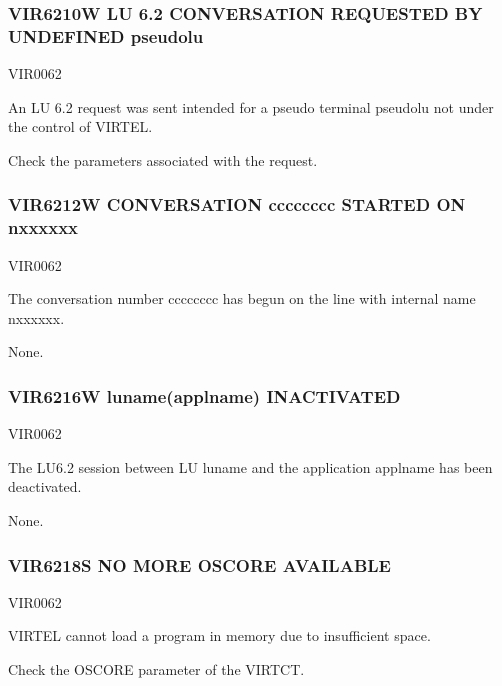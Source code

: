 \documentclass[letterpaper,10pt,english]{sphinxmanual}
\begin{document}
\subsubsection{VIR6210W LU 6.2 CONVERSATION REQUESTED BY UNDEFINED pseudolu}
\label{\detokenize{messages:vir6210w-lu-6-2-conversation-requested-by-undefined-pseudolu}}\begin{description}
\sphinxAtStartPar
VIR0062

\sphinxAtStartPar
An LU 6.2 request was sent intended for a pseudo terminal pseudolu not under the control of VIRTEL.

\sphinxAtStartPar
Check the parameters associated with the request.

\end{description}


\subsubsection{VIR6212W CONVERSATION cccccccc STARTED  ON n\sphinxhyphen{}xxxxxx}
\label{\detokenize{messages:vir6212w-conversation-cccccccc-started-on-n-xxxxxx}}\begin{description}
\sphinxAtStartPar
VIR0062

\sphinxAtStartPar
The conversation number cccccccc has begun on the line with internal name n\sphinxhyphen{}xxxxxx.

\sphinxAtStartPar
None.

\end{description}


\subsubsection{VIR6216W luname(applname) INACTIVATED}
\label{\detokenize{messages:vir6216w-luname-applname-inactivated}}\begin{description}
\sphinxAtStartPar
VIR0062

\sphinxAtStartPar
The LU6.2 session between LU luname and the application applname has been deactivated.

\sphinxAtStartPar
None.

\end{description}


\subsubsection{VIR6218S NO MORE OSCORE AVAILABLE}
\label{\detokenize{messages:vir6218s-no-more-oscore-available}}\begin{description}
\sphinxAtStartPar
VIR0062

\sphinxAtStartPar
VIRTEL cannot load a program in memory due to insufficient space.

\sphinxAtStartPar
Check the OSCORE parameter of the VIRTCT.

\end{description}
\end{document}
